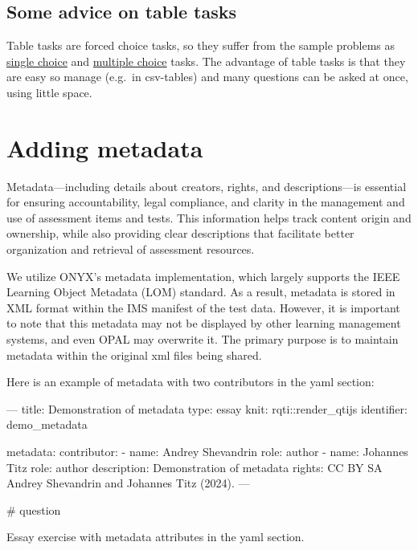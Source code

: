 \documentclass[twoside]{tufte-book}
\newenvironment{Shaded}{}{}
\begin{document}
\section{Some advice on table tasks}\label{some-advice-on-table-tasks}

Table tasks are forced choice tasks, so they suffer from the sample problems as \href{singlechoice.html}{single choice} and \href{multiplechoice.html}{multiple choice} tasks. The advantage of table tasks is that they are easy so manage (e.g.~in csv-tables) and many questions can be asked at once, using little space.

\chapter{Adding metadata}\label{adding-metadata}

Metadata---including details about creators, rights, and descriptions---is essential for ensuring accountability, legal compliance, and clarity in the management and use of assessment items and tests. This information helps track content origin and ownership, while also providing clear descriptions that facilitate better organization and retrieval of assessment resources.

We utilize ONYX's metadata implementation, which largely supports the IEEE Learning Object Metadata (LOM) standard. As a result, metadata is stored in XML format within the IMS manifest of the test data. However, it is important to note that this metadata may not be displayed by other learning management systems, and even OPAL may overwrite it. The primary purpose is to maintain metadata within the original xml files being shared.

Here is an example of metadata with two contributors in the yaml section:

\begin{Shaded}
\begin{Highlighting}
---
title: Demonstration of metadata
type: essay
knit: rqti::render_qtijs
identifier: demo_metadata

metadata:
  contributor:
    - name: Andrey Shevandrin
      role: author
    - name: Johannes Titz
      role: author
  description: Demonstration of metadata
  rights: CC BY SA Andrey Shevandrin and Johannes Titz (2024).
---

# question

Essay exercise with metadata attributes in the yaml section.
\end{Highlighting}
\end{Shaded}
\end{document}
